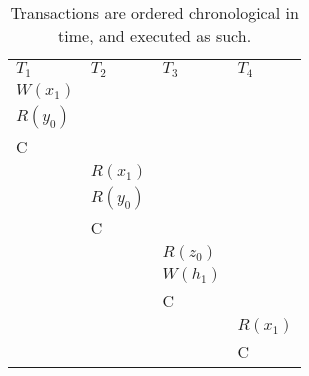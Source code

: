 \begin{table}[h!]
    \begin{tabular}{l|l|l|l}
        $T_1$            & $T_2$            & $T_3$   & $T_4$   \\
        $W(x_1)$ &      &      &      \\
        $R(y_0)$ &      &      &      \\
        C    &      &      &      \\
        & $R(x_1)$ &      &      \\
        & $R(y_0)$ &      &      \\
        & C    &      &      \\
        &      & $R(z_0)$ &      \\
        &      & $W(h_1)$ &      \\
        &      & C    &      \\
        &      &      & $R(x_1)$ \\
        &      &      & C
    \end{tabular}
    \caption{Transactions are ordered chronological in time, and executed as such.}
\end{table}
